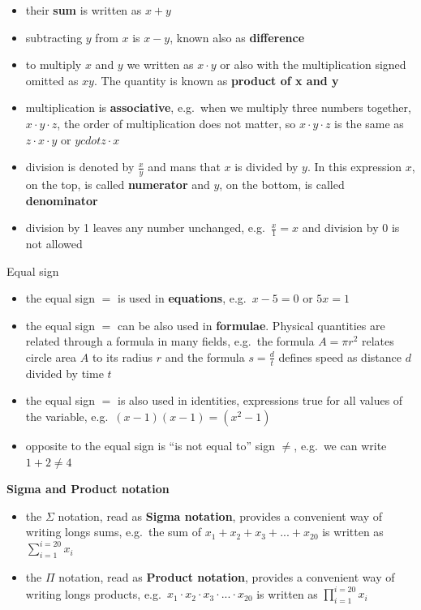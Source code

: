 \documentclass[
]{book}
\providecommand{\tightlist}{%
  \setlength{\itemsep}{0pt}\setlength{\parskip}{0pt}}
\theoremstyle{definition}
\theoremstyle{definition}
\theoremstyle{definition}
\theoremstyle{remark}
\begin{document}
\begin{itemize}
\tightlist
\item
  their \textbf{sum} is written as \(x + y\)
\item
  subtracting \(y\) from \(x\) is \(x - y\), known also as \textbf{difference}
\item
  to multiply \(x\) and \(y\) we written as \(x \cdot y\) or also with the multiplication signed omitted as \(xy\). The quantity is known as \textbf{product of x and y}
\item
  multiplication is \textbf{associative}, e.g.~when we multiply three numbers together, \(x \cdot y \cdot z\), the order of multiplication does not matter, so \(x \cdot y \cdot z\) is the same as \(z \cdot x \cdot y\) or \(y cdot z \cdot x\)
\item
  division is denoted by \(\frac{x}{y}\) and mans that \(x\) is divided by \(y\). In this expression \(x\), on the top, is called \textbf{numerator} and \(y\), on the bottom, is called \textbf{denominator}
\item
  division by 1 leaves any number unchanged, e.g.~\(\frac{x}{1}=x\) and division by 0 is not allowed
\end{itemize}

Equal sign

\begin{itemize}
\tightlist
\item
  the equal sign \(=\) is used in \textbf{equations}, e.g.~\(x - 5 = 0\) or \(5x = 1\)
\item
  the equal sign \(=\) can be also used in \textbf{formulae}. Physical quantities are related through a formula in many fields, e.g.~the formula \(A=\pi r^2\) relates circle area \(A\) to its radius \(r\) and the formula \(s = \frac{d}{t}\) defines speed as distance \(d\) divided by time \(t\)
\item
  the equal sign \(=\) is also used in identities, expressions true for all values of the variable, e.g.~\((x-1)(x-1) = (x^2-1)\)
\item
  opposite to the equal sign is ``is not equal to'' sign \(\neq\), e.g.~we can write \(1+2 \neq 4\)
\end{itemize}

\textbf{Sigma and Product notation}

\begin{itemize}
\tightlist
\item
  the \(\Sigma\) notation, read as \textbf{Sigma notation}, provides a convenient way of writing longs sums, e.g.~the sum of \(x_1 + x_2 + x_3 + ... + x_{20}\) is written as \(\displaystyle \sum_{i=1}^{i=20}x_i\)
\item
  the \(\Pi\) notation, read as \textbf{Product notation}, provides a convenient way of writing longs products, e.g.~\(x_1 \cdot x_2 \cdot x_3 \cdot ... \cdot x_{20}\) is written as \(\displaystyle \prod_{i=1}^{i=20}x_i\)
\end{itemize}
\end{document}
